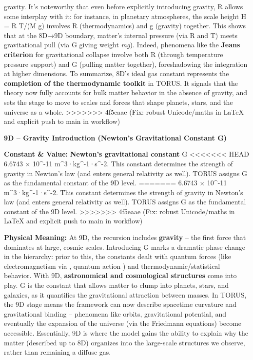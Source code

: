 \documentclass[]{article}
\begin{document}
gravity. It's noteworthy that even before explicitly introducing
gravity, R allows some interplay with it: for instance, in planetary
atmospheres, the scale height H = R T/(M g) involves R (thermodynamics)
and g (gravity) together​. This shows that at the 8D→9D boundary,
matter's internal pressure (via R and T) meets gravitational pull (via G
giving weight \emph{mg}). Indeed, phenomena like the \textbf{Jeans
criterion} for gravitational collapse involve both R (through
temperature pressure support) and G (pulling matter together),
foreshadowing the integration at higher dimensions. To summarize, 8D's
ideal gas constant represents the \textbf{completion of the
thermodynamic toolkit} in TORUS. It signals that the theory now fully
accounts for bulk matter behavior in the absence of gravity, and sets
the stage to move to scales and forces that shape planets, stars, and
the universe as a whole.
>>>>>>> 4f5eaae (Fix: robust Unicode/maths in LaTeX and explicit push to main in workflow)

\textbf{9D -- Gravity Introduction (Newton's Gravitational Constant G)}

\textbf{Constant \& Value:} \textbf{Newton's gravitational constant} G \approx
<<<<<<< HEAD
6.6743 × 10\^{}-11 m\^{}3·kg\^{}-1·s\^{}-2\hspace{0pt}. This constant
determines the strength of gravity in Newton's law (and enters general
relativity as well). TORUS assigns G as the fundamental constant of the
9D level.
=======
6.6743 × 10\^{}-11 m\^{}3·kg\^{}-1·s\^{}-2​. This constant determines
the strength of gravity in Newton's law (and enters general relativity
as well). TORUS assigns G as the fundamental constant of the 9D level.
>>>>>>> 4f5eaae (Fix: robust Unicode/maths in LaTeX and explicit push to main in workflow)

\textbf{Physical Meaning:} At 9D, the recursion includes
\textbf{gravity} -- the first force that dominates at large, cosmic
scales. Introducing G marks a dramatic phase change in the hierarchy:
prior to this, the constants dealt with quantum forces (like
electromagnetism via \alpha, quantum action \hbar) and thermodynamic/statistical
behavior. With 9D, \textbf{astronomical and cosmological structures}
come into play​. G is the constant that allows matter to clump into
planets, stars, and galaxies, as it quantifies the gravitational
attraction between masses. In TORUS, the 9D stage means the framework
can now describe spacetime curvature and gravitational binding --
phenomena like orbits, gravitational potential, and eventually the
expansion of the universe (via the Friedmann equations) become
accessible. Essentially, 9D is where the model gains the ability to
explain why the matter (described up to 8D) organizes into the
large-scale structures we observe, rather than remaining a diffuse gas.
\end{document}
